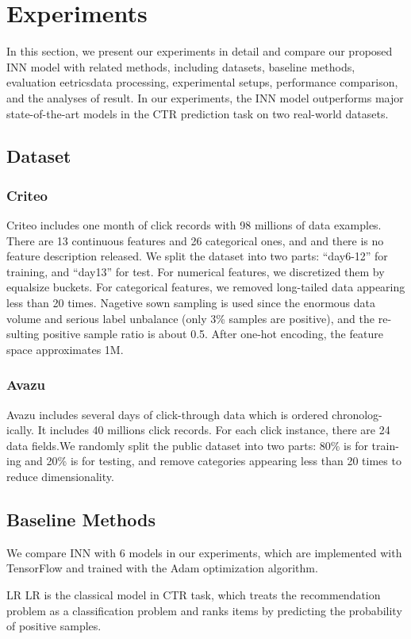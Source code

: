 \documentclass[journal]{IEEEtran}
\begin{document}
\section{Experiments}
In this section, we present our experiments in detail and compare our proposed INN model with related methods, including datasets, baseline methods, evaluation eetricsdata processing, experimental setups, performance comparison, and the analyses of result. In our experiments, the INN model outperforms major state-of-the-art models in the CTR prediction task on two real-world datasets.
\subsection{Dataset}
\subsubsection{Criteo}
Criteo includes one month of click records with 98 millions of data examples. There are 13 continuous features and 26 categorical ones, and and there is no feature description released. We split the dataset into two parts: “day6-12” for training, and “day13” for test. For numerical features, we discretized them by equalsize buckets. For categorical features, we removed long-tailed data appearing less than 20 times. Nagetive sown sampling is used since the enormous data volume and serious label unbalance (only 3\% samples are positive), and the re-sulting positive sample ratio is about 0.5. After one-hot encoding, the feature space approximates 1M.

\subsubsection{Avazu}
Avazu includes several days of click-through data which is ordered chronolog-ically. It includes 40 millions click records. For each click instance, there are 24 data fields.We randomly split the public dataset into two parts: 80\% is for train-ing and 20\% is for testing, and remove categories appearing less than 20 times to reduce dimensionality.

\subsection{Baseline Methods}
We compare INN with 6 models in our experiments, which are implemented with TensorFlow and trained with the Adam optimization algorithm.

LR LR is the classical model in CTR task, which treats the recommendation problem as a classification problem and ranks items by predicting the probability of positive samples.
\end{document}
